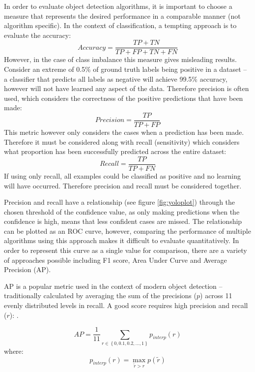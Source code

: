 \documentclass[a4paper,twoside,12pt]{report}
\begin{document}
In order to evaluate object detection algorithms, it is important to choose a measure that represents the desired performance in a comparable manner (not algorithm specific). In the context of classification, a tempting approach is to evaluate the accuracy:
\begin{equation}
Accuracy = \frac{TP + TN}{TP + FP + TN + FN}
\end{equation}
However, in the case of class imbalance this measure gives misleading results. Consider an extreme of 0.5\% of ground truth labels being positive in a dataset -- a classifier that predicts all labels as negative will achieve 99.5\% accuracy, however will not have learned any aspect of the data. Therefore precision is often used, which considers the correctness of the positive predictions that have been made:
\begin{equation}
Precision = \frac{TP}{TP + FP}
\end{equation}
This metric however only considers the cases when a prediction has been made. Therefore it must be considered along with recall (sensitivity) which considers what proportion has been successfully predicted across the entire dataset:
\begin{equation}
Recall = \frac{TP}{TP + FN}
\end{equation}
If using only recall, all examples could be classified as positive and no learning will have occurred. Therefore precision and recall must be considered together.

Precision and recall have a relationship (see figure \ref{fig:yoloplot}) through the chosen threshold of the confidence value, as only making predictions when the confidence is high, means that less confident cases are missed. The relationship can be plotted as an ROC curve, however, comparing the performance of multiple algorithms using this approach makes it difficult to evaluate quantitatively. In order to represent this curve as a single value for comparison, there are a variety of approaches possible including F1 score, Area Under Curve and Average Precision (AP).

AP is a popular metric used in the context of modern object detection -- traditionally calculated by averaging the sum of the precisions ($p$) across 11 evenly distributed levels in recall. A good score requires high precision and recall ($r$): \citep{vocdataset}.

\begin{equation}
AP = \frac{1}{11}\sum_{r\in\left\{0,0.1,0.2,...,1\right\}}^{} p_{interp}(r)
\end{equation}
where:
\begin{equation}
p_{interp}(r) =\max_{\widetilde{r} > r} p(\widetilde{r})
\end{equation}
\end{document}
